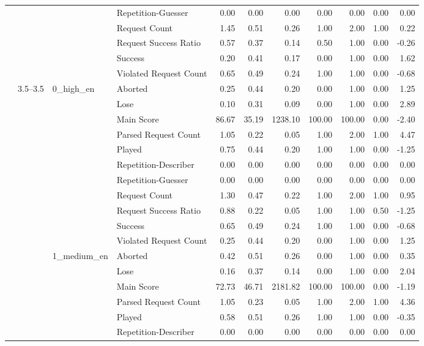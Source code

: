 \begin{tabular}{llllrrrrrrr}
 &  &  & Repetition-Guesser & 0.00 & 0.00 & 0.00 & 0.00 & 0.00 & 0.00 & 0.00 \\
 &  &  & Request Count & 1.45 & 0.51 & 0.26 & 1.00 & 2.00 & 1.00 & 0.22 \\
 &  &  & Request Success Ratio & 0.57 & 0.37 & 0.14 & 0.50 & 1.00 & 0.00 & -0.26 \\
 &  &  & Success & 0.20 & 0.41 & 0.17 & 0.00 & 1.00 & 0.00 & 1.62 \\
 &  &  & Violated Request Count & 0.65 & 0.49 & 0.24 & 1.00 & 1.00 & 0.00 & -0.68 \\
\cline{2-11} \cline{3-11}
 & \multirow[t]{33}{*}{3.5--3.5} & \multirow[t]{11}{*}{0_high_en} & Aborted & 0.25 & 0.44 & 0.20 & 0.00 & 1.00 & 0.00 & 1.25 \\
 &  &  & Lose & 0.10 & 0.31 & 0.09 & 0.00 & 1.00 & 0.00 & 2.89 \\
 &  &  & Main Score & 86.67 & 35.19 & 1238.10 & 100.00 & 100.00 & 0.00 & -2.40 \\
 &  &  & Parsed Request Count & 1.05 & 0.22 & 0.05 & 1.00 & 2.00 & 1.00 & 4.47 \\
 &  &  & Played & 0.75 & 0.44 & 0.20 & 1.00 & 1.00 & 0.00 & -1.25 \\
 &  &  & Repetition-Describer & 0.00 & 0.00 & 0.00 & 0.00 & 0.00 & 0.00 & 0.00 \\
 &  &  & Repetition-Guesser & 0.00 & 0.00 & 0.00 & 0.00 & 0.00 & 0.00 & 0.00 \\
 &  &  & Request Count & 1.30 & 0.47 & 0.22 & 1.00 & 2.00 & 1.00 & 0.95 \\
 &  &  & Request Success Ratio & 0.88 & 0.22 & 0.05 & 1.00 & 1.00 & 0.50 & -1.25 \\
 &  &  & Success & 0.65 & 0.49 & 0.24 & 1.00 & 1.00 & 0.00 & -0.68 \\
 &  &  & Violated Request Count & 0.25 & 0.44 & 0.20 & 0.00 & 1.00 & 0.00 & 1.25 \\
\cline{3-11}
 &  & \multirow[t]{11}{*}{1_medium_en} & Aborted & 0.42 & 0.51 & 0.26 & 0.00 & 1.00 & 0.00 & 0.35 \\
 &  &  & Lose & 0.16 & 0.37 & 0.14 & 0.00 & 1.00 & 0.00 & 2.04 \\
 &  &  & Main Score & 72.73 & 46.71 & 2181.82 & 100.00 & 100.00 & 0.00 & -1.19 \\
 &  &  & Parsed Request Count & 1.05 & 0.23 & 0.05 & 1.00 & 2.00 & 1.00 & 4.36 \\
 &  &  & Played & 0.58 & 0.51 & 0.26 & 1.00 & 1.00 & 0.00 & -0.35 \\
 &  &  & Repetition-Describer & 0.00 & 0.00 & 0.00 & 0.00 & 0.00 & 0.00 & 0.00 \\

\end{tabular}
